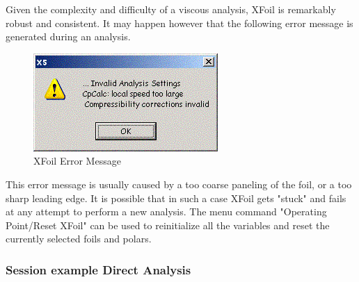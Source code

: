 \documentclass[a4paper,twoside,12pt,dvips]{article}
\begin{document}
Given the complexity and difficulty of a viscous analysis, XFoil is
remarkably robust and consistent. It may happen however that the
following error message is generated during an analysis.

\begin{figure}[htbp]
  \includegraphics[width=0.4\linewidth]{img-04}\centering 
  \caption{XFoil Error Message}
  \label{fig:xfoil_error_message}
\end{figure}

This error message is usually caused by a too coarse paneling of the
foil, or a too sharp leading edge. It is possible that in such a case
XFoil gets "stuck" and fails at any attempt to perform a new
analysis. The menu command "Operating Point/Reset XFoil" can be used
to reinitialize all the variables and reset the currently selected
foils and polars.

\subsubsection{Session example Direct Analysis}
\end{document}

